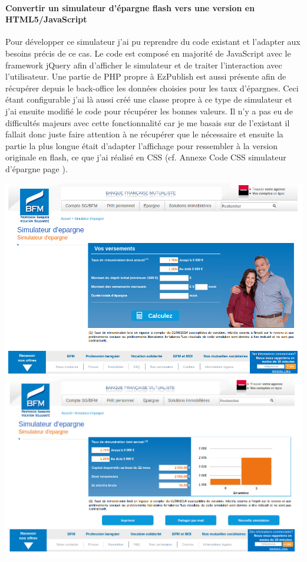 \documentclass[a4paper,11pt,twoside]{report}
\begin{document}
      \paragraph*{Convertir un simulateur d'épargne flash vers une version en HTML5/JavaScript}
      Pour développer ce simulateur j'ai pu reprendre du code existant et l'adapter aux besoins précis de ce cas. Le code est composé en majorité de JavaScript avec le framework jQuery afin d'afficher le simulateur et de traiter l'interaction avec l'utilisateur. Une partie de PHP propre à EzPublish est aussi présente afin de récupérer depuis le back-office les données choisies pour les taux d'épargnes. Ceci étant configurable j'ai là aussi créé une classe propre à ce type de simulateur et j'ai ensuite modifié le code pour récupérer les bonnes valeurs. Il n'y a pas eu de difficultés majeurs avec cette fonctionnalité car je me basais sur de l'existant il fallait donc juste faire attention à ne récupérer que le nécessaire et ensuite la partie la plus longue était d'adapter l'affichage pour ressembler à la version originale en flash, ce que j'ai réalisé en CSS (cf. Annexe Code CSS simulateur d'épargne page \pageref{code_CSS_simulateur_d_epargne}).
      \begin{center}
	\includegraphics[width=\textwidth]{images/simu_epargne1.png} 
	\includegraphics[width=\textwidth]{images/simu_epargne2.png} 
	\label{epargne_simulator}
      \end{center}
\end{document}
